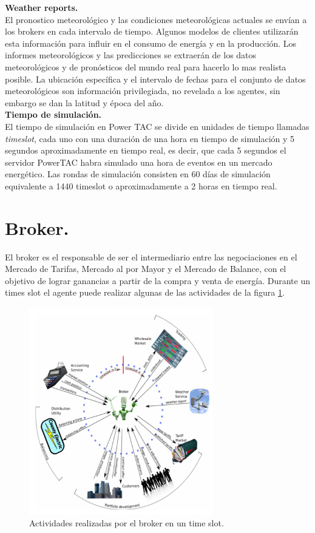 \textbf{Weather reports.}\\

El pronostico meteorológico y las condiciones meteorológicas actuales se envían a los brokers en cada intervalo de tiempo. Algunos modelos de clientes utilizarán esta información para influir en el consumo de energía y en la producción. Los informes meteorológicos y las predicciones se extraerán de los datos meteorológicos y de pronósticos del mundo real para hacerlo lo mas realista posible. La ubicación específica y el intervalo de fechas para el conjunto de datos meteorológicos son información privilegiada, no revelada a los agentes, sin embargo se dan la latitud y época del año.\\

\textbf{Tiempo de simulación.}\\

El tiempo de simulación en Power TAC se divide en unidades de tiempo llamadas \textit{timeslot}, cada uno con una duración de una hora en tiempo de simulación y 5 segundos aproximadamente en tiempo real, es decir, que cada 5 segundos el servidor PowerTAC habra simulado una hora de eventos en un mercado energético.
Las rondas de simulación consisten en 60 días de simulación equivalente a 1440 timeslot o aproximadamente a 2 horas en tiempo real.\\

\section{Broker.}

El broker es el responsable de ser el intermediario entre las negociaciones en el Mercado de Tarifas, Mercado al por Mayor y el Mercado de Balance, con el objetivo de lograr ganancias a partir de la compra y venta de energía. Durante un times slot el agente puede realizar algunas de las actividades de la figura \ref{activity}.

\begin{figure}[!h]
	\centering
	\includegraphics[width=8cm]{img/process.png}
	\caption{Actividades realizadas por el broker en un time slot.}
	\label{activity}
\end{figure}

